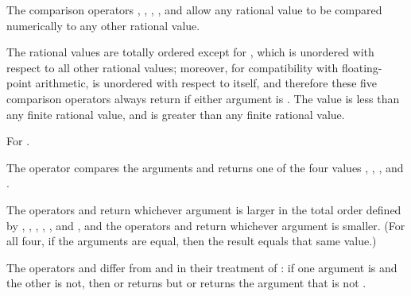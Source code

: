 The comparison operators \EXP{<}, \EXP{\leq}, \EXP{=}, \EXP{\geq}, and \EXP{>}
allow any rational value to be compared numerically to any other rational value.

The rational values are totally ordered except for ,
which is unordered with respect to all other rational values;
moreover, for compatibility with floating-point arithmetic,  is
unordered with respect to itself, and therefore these five comparison operators
always return  if either argument is .
The value \EXP{-\infty} is less than any finite rational value,
and \EXP{+\infty} is greater than any finite rational value.

For \EXP{\neq} .


The  operator compares the arguments and returns one of the four values
, , , and .



The operators  and  return whichever argument is larger
in the total order defined by \EXP{<}, \EXP{\leq}, \EXP{=}, \EXP{\geq}, \EXP{>}, and ,
and the operators  and  return whichever argument is smaller.
(For all four, if the arguments are equal, then the result equals that same value.)

The operators  and  differ from
 and  in their treatment of :
if one argument is  and the other is not, then  or  returns  but
 or  returns the argument that is not .



